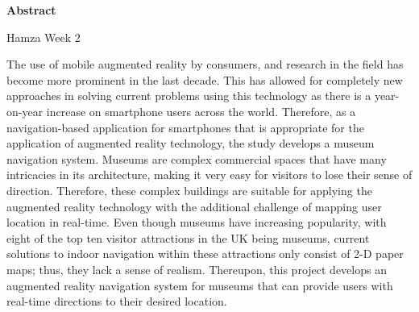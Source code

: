 \begin{center}        
    \Large
    \textbf{Abstract}\\
\end{center}

Hamza Week 2

The use of mobile augmented reality by consumers, and research in the field has become more prominent in the last decade. This has allowed for completely new approaches in solving current problems using this technology as there is a year-on-year increase on smartphone users across the world. Therefore, as a navigation-based application for smartphones that is appropriate for the application of augmented reality technology, the study develops a museum navigation system. Museums are complex commercial spaces that have many intricacies in its architecture, making it very easy for visitors to lose their sense of direction. Therefore, these complex buildings are suitable for applying the augmented reality technology with the additional challenge of mapping user location in real-time. Even though museums have increasing popularity, with eight of the top ten visitor attractions in the UK being museums, current solutions to indoor navigation within these attractions only consist of 2-D paper maps; thus, they lack a sense of realism. Thereupon, this project develops an augmented reality navigation system for museums that can provide users with real-time directions to their desired location.



\afterpage{\blankpage}